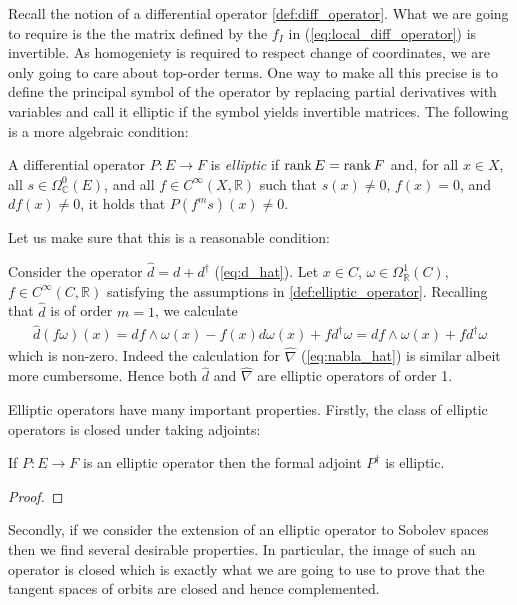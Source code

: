 \documentclass[12pt]{ociamthesis}  %
\begin{document}
Recall the notion of a differential operator \ref{def:diff_operator}.
What we are going to require is the the matrix defined by the
$f_I$ in (\ref{eq:local_diff_operator}) is invertible.
As homogeniety is required to respect change of coordinates,
we are only going to care about top-order terms. One way to make all
this precise is to define the principal symbol of the operator by
replacing partial derivatives with variables and
call it elliptic if the symbol yields invertible matrices.
The following is a more algebraic condition:

\begin{definition}\label{def:elliptic_operator}
  A differential operator $P:E\to F$ is \emph{elliptic} if
  $\operatorname{rank} E = \operatorname{rank} F$ and, for all $x\in X$, all $s\in\Omega^0_{\mathbb C}(E)$,
  and all $f\in C^\infty(X,\mathbb R)$ such that $s(x) \neq 0$,
  $f(x) = 0$, and $df(x) \neq 0$, it holds that $P(f^m s)(x) \neq 0$.
\end{definition}

Let us make sure that this is a reasonable condition:

\begin{example}
  Consider the operator $\hat d = d + d^\dagger$ (\ref{eq:d_hat}). Let
  $x\in C$, $\omega\in\Omega^1_{\mathbb R}(C)$,
  $f\in C^\infty(C,\mathbb R)$
  satisfying the assumptions in \ref{def:elliptic_operator}.
  Recalling that $\hat d$ is of order $m=1$, we calculate
  \begin{align*}
    \hat d(f\omega)(x)= df\wedge \omega(x) - f(x)d\omega(x) + fd^\dagger\omega= df\wedge\omega(x) + fd^\dagger\omega
  \end{align*}
  which is non-zero. Indeed the calculation for
  $\hat\nabla$ (\ref{eq:nabla_hat}) is similar albeit more cumbersome.
  Hence both $\hat d$ and $\hat\nabla$ are elliptic operators of order 1.
\end{example}

Elliptic operators have many important properties. Firstly, the class
of elliptic operators is closed under taking adjoints:

\begin{lemma}\label{lem:elliptic_adjoints}
  If $P : E \to F$ is an elliptic operator then the formal adjoint
  $P^\dagger$ is elliptic.
  \begin{proof}
    \missingproof
  \end{proof}
\end{lemma}

Secondly, if we consider the extension of an elliptic operator
to Sobolev spaces then we find several desirable properties.
In particular, the image of such an operator is closed which is
exactly what we are going to use to prove that the tangent spaces
of orbits are closed and hence complemented.
\end{document}
